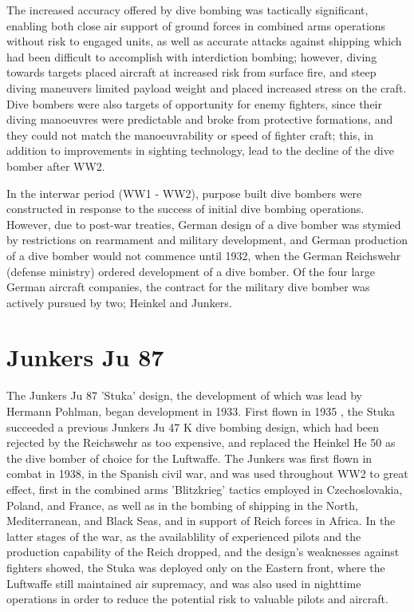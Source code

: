 \documentclass[a4paper, fontsize=11pt]{scrartcl} %
\begin{document}
The increased accuracy offered by dive bombing was tactically
significant, enabling both close air support
of ground forces in combined arms operations without risk to engaged
units, as well as accurate attacks against shipping which had been
difficult to accomplish with interdiction bombing; however, diving
towards targets placed aircraft at increased risk from surface fire, and
steep diving maneuvers limited payload weight and placed increased
stress on the craft. Dive bombers were also targets of opportunity for
enemy fighters, since their diving manoeuvres were predictable and broke from
protective formations, and they could not match the manoeuvrability or
speed of fighter craft; this, in addition to improvements in sighting
technology, lead to the decline of the dive bomber after WW2.


In the interwar period (WW1 - WW2), purpose built dive bombers were constructed in
response to the success of initial dive bombing operations. However, due
to post-war treaties, German design of a dive bomber was
stymied by restrictions on rearmament and military development, and
German production of a dive bomber would not commence until 1932, when
the German Reichswehr (defense ministry) ordered development of a dive
bomber. Of the four large German aircraft companies, the contract for
the military dive bomber was actively pursued by two; Heinkel and
Junkers.

\section{Junkers Ju 87}

The Junkers Ju 87 'Stuka' design, the development of
which was lead by Hermann Pohlman, began development in 1933. First flown
in 1935 \autocite[p.~9]{weal97}, the Stuka succeeded a previous
Junkers Ju 47 K dive bombing design, which had been rejected by the
Reichswehr as too expensive, and replaced the
Heinkel He 50 as the dive bomber of choice for the Luftwaffe. The
Junkers was first flown in combat in 1938, in the Spanish civil war, and
was used throughout WW2 to great effect, first in the combined arms
'Blitzkrieg' tactics employed in Czechoslovakia, Poland, and France, as
well as in the bombing of shipping in the North, Mediterranean, and
Black Seas, and in support of Reich forces in Africa. In the latter
stages of the war, as the availablility of experienced pilots and the production capability of the Reich
dropped, and the design's weaknesses against fighters showed, the Stuka
was deployed only on the Eastern front, where the Luftwaffe still
maintained air supremacy, and was also used in nighttime operations in order to
reduce the potential risk to valuable pilots and aircraft.
\end{document}
